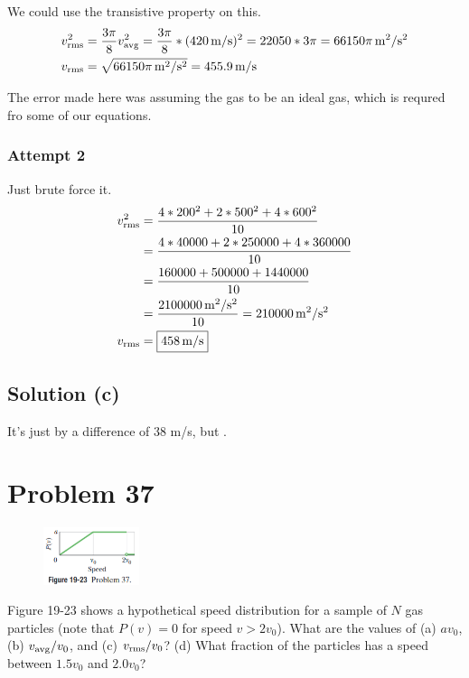 \documentclass[12pt]{article}
\begin{document}
                We could use the transistive property on this.
                \begin{align}
                    v_{\rm rms}^2   &=  \frac{3 \pi}{8} v_{\rm avg}^2
                        =   \frac{3 \pi}{8} * (420\,\unit{\meter/\second})^2
                        =   22050 * 3\pi
                        =   66150\pi\,\unit{\meter^2/\second^2}\\
                    v_{\rm rms} &=  \sqrt{66150\pi\,\unit{\meter^2/\second^2}}
                        =   455.9\,\unit{\meter/\second}
                \end{align}

                The error made here was assuming the gas to be an ideal gas, which is requred fro some of our equations.

            \subsubsection{Attempt 2}
                Just brute force it.
                \begin{align}
                    v_{\rm rms}^2   &=  \frac{4 * 200^2 + 2 * 500^2 + 4 * 600^2}{10}\\
                        &=  \frac{4 * 40000 + 2 * 250000 + 4 * 360000}{10}\\
                        &=  \frac{160000 + 500000 + 1440000}{10}\\
                        &=  \frac{2100000\,\unit{\meter^2/\second^2}}{10}
                        =   210000\,\unit{\meter^2/\second^2}\\
                    v_{\rm rms} &=  \boxed{458\,\unit{\meter/\second}}
                \end{align}

        \subsection{Solution (c)}
            It's just by a difference of 38 \unit{\meter/\second}, but .

    \pagebreak
    \section{Problem 37}
        \begin{figure}
            \vspace{-30pt}
            \includegraphics[width=0.25\textwidth]{picture_19-23.png} 
        \end{figure}
        Figure 19-23 shows a hypothetical speed distribution for a sample of $N$ gas particles (note that $P(v) = 0$ for speed $v > 2v_0$).
        What are the values of (a) $av_0$, (b) $v_{\rm avg}/v_0$, and (c) $v_{\rm rms}/v_0$? 
        (d) What fraction of the particles has a speed between $1.5v_0$ and $2.0v_0$?
\end{document}
